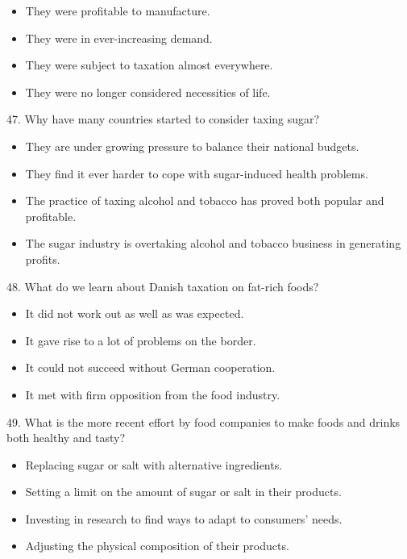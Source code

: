 \documentclass[UTF8,11pt]{ctexart}
\begin{document}
\begin{itemize}[leftmargin=2em,itemsep=.2em,topsep=.4em]\item[A.] They were profitable to manufacture.
\item[B.] They were in ever-increasing demand.
\item[C.] They were subject to taxation almost everywhere.
\item[D.] They were no longer considered necessities of life.
\end{itemize}

47. Why have many countries started to consider taxing sugar?


\begin{itemize}[leftmargin=2em,itemsep=.2em,topsep=.4em]\item[A.] They are under growing pressure to balance their national budgets.
\item[B.] They find it ever harder to cope with sugar-induced health problems.
\item[C.] The practice of taxing alcohol and tobacco has proved both popular and profitable.
\item[D.] The sugar industry is overtaking alcohol and tobacco business in generating profits.
\end{itemize}

48. What do we learn about Danish taxation on fat-rich foods?


\begin{itemize}[leftmargin=2em,itemsep=.2em,topsep=.4em]\item[A.] It did not work out as well as was expected.
\item[B.] It gave rise to a lot of problems on the border.
\item[C.] It could not succeed without German cooperation.
\item[D.] It met with firm opposition from the food industry.
\end{itemize}

49. What is the more recent effort by food companies to make foods and drinks both healthy and tasty?


\begin{itemize}[leftmargin=2em,itemsep=.2em,topsep=.4em]\item[A.] Replacing sugar or salt with alternative ingredients.
\end{itemize}

\begin{itemize}[leftmargin=2em,itemsep=.2em,topsep=.4em]\item[B.] Setting a limit on the amount of sugar or salt in their products.
\item[C.] Investing in research to find ways to adapt to consumers' needs.
\item[D.] Adjusting the physical composition of their products.
\end{itemize}
\end{document}
